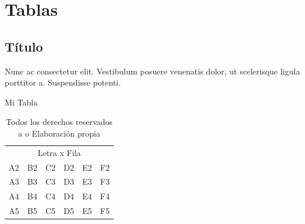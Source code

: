 \documentclass[stu, 12pt, letterpaper, donotrepeattitle, floatsintext, natbib]{apa7}
\begin{document}

\newpage

\section{Tablas}
\subsection{Título} 
Nunc ac consectetur elit. Vestibulum posuere venenatis dolor, ut scelerisque ligula porttitor a. Suspendisse potenti.\par
\begin{table}[h]
\centering
\caption{Mi Tabla}
\label{tab:my-tableuno}
\begin{tabular}{llllll}
\multicolumn{6}{c}{Letra x Fila} \\
A2  & B2  & C2  & D2  & E2  & F2 \\
A3  & B3  & C3  & D3  & E3  & F3 \\
A4  & B4  & C4  & D4  & E4  & F4 \\
A5  & B5  & C5  & D5  & E5  & F5
\end{tabular}
\caption*{Todos los derechos reservados a   o Elaboración propia}
\end{table}
\end{document}
